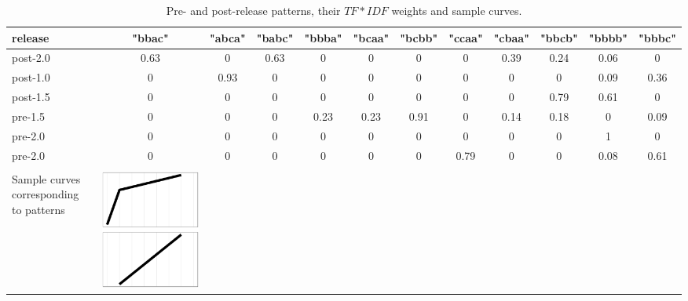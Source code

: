 \documentclass[10pt, conference, compsocconf]{IEEEtran}
\begin{document}
\begin{table}
  \caption{Pre- and post-release patterns, their $TF\ast IDF$ weights and sample curves.}
  \label{tab:tokens}
  \begin{tabular}{ | b{1.5cm} | c | c | c | c | c | c | c | c | c | c | c |}
  \hline
release & "bbac" & "abca" & "babc" & "bbba" & "bcaa" & "bcbb" & "ccaa" & "cbaa" & "bbcb" & "bbbb" & "bbbc"\\ 
  \hline
 post-2.0 & 0.63 & 0 & 0.63 & 0 & 0 & 0 & 0 & 0.39 & 0.24 & 0.06 & 0\\ 
 post-1.0 & 0 & 0.93 & 0 & 0 & 0 & 0 & 0 & 0 & 0 & 0.09 & 0.36\\ 
 post-1.5 & 0 & 0 & 0 & 0 & 0 & 0 & 0 & 0 & 0.79 & 0.61 & 0\\ 
 pre-1.5 & 0 & 0 & 0 & 0.23 & 0.23 & 0.91 & 0 & 0.14 & 0.18 & 0 & 0.09\\ 
 pre-2.0 & 0 & 0 & 0 & 0 & 0 & 0 & 0 & 0 & 0 & 1 & 0\\ 
 pre-2.0 & 0 & 0 & 0 & 0 & 0 & 0 & 0.79 & 0 & 0 & 0.08 & 0.61\\
 \hline 
 &  &  &  &  &  &  & &  &  &  & \\
 Sample curves corresponding to patterns &
 \includegraphics[scale=0.08]{figures/bbac.ps} &

\end{tabular}
\end{table}
\end{document}
